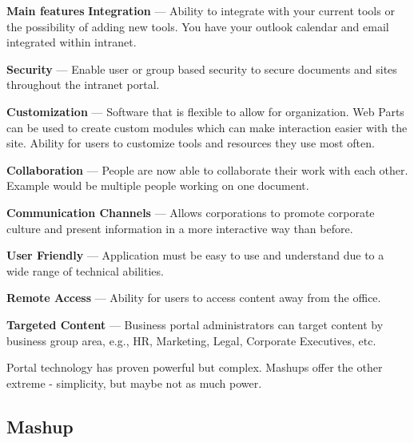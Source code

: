 		\textbf{Main features}
		\textbf{Integration} — Ability to integrate with your current tools or the possibility of adding new tools. You have your outlook calendar and email integrated within intranet.

        \textbf{Security} — Enable user or group based security to secure documents and sites throughout the intranet portal.

		\textbf{Customization} — Software that is flexible to allow for organization. Web Parts can be used to create custom modules which can make interaction easier with the site. Ability for users to customize tools and resources they use most often.

		\textbf{Collaboration} — People are now able to collaborate their work with each other. Example would be multiple people working on one document.

		\textbf{Communication Channels} — Allows corporations to promote corporate culture and present information in a more interactive way than before.

		\textbf{User Friendly} — Application must be easy to use and understand due to a wide range of technical abilities.

		\textbf{Remote Access} — Ability for users to access content away from the office.

		\textbf{Targeted Content} — Business portal administrators can target content by business group area, e.g., HR, Marketing, Legal, Corporate Executives, etc.

		Portal technology has proven powerful but complex. Mashups offer the other extreme - simplicity, but maybe not as much power. 

	\subsection{Mashup}

